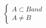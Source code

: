 \documentclass[preview]{standalone}
\begin{document}
\begin{align*}
\begin{cases}
                         A \subset B and\\
                         A \neq B
                         \end{cases}
\end{align*}
\end{document}

